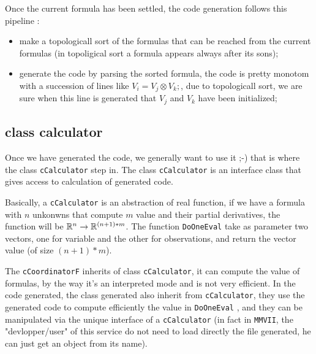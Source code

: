 Once the current formula has been settled, the code generation follows this pipeline :

\begin{itemize}
     \item make a topologicall sort of the formulas that can be reached from the current formulas
         (in topoligical sort a formula appears always after its sons);

     \item generate the code by parsing the sorted formula, the code is pretty monotom with 
           a succession of lines like $V_i = V_j \otimes V_k; $, due to topologicall sort, we are
           sure when this line is generated that $V_j$ and $V_k$ have been initialized;
\end{itemize}



\subsection{class calculator}

Once we have generated the code, we generally want to use it ;-)  that is where 
the class {\tt cCalculator} step in.  The class {\tt cCalculator} is an interface
class that gives access to calculation of generated code.

Basically,  a {\tt cCalculator} is an abstraction of real function,
if we have a formula with $n$ unkonwns that compute $m$ value and their partial derivatives,
the function will be $\mathbb{R}^n \rightarrow \mathbb{R}^{(n+1)*m}$. 
The function {\tt DoOneEval} take as parameter two vectors, one for variable and the other
for observations, and return the vector value (of size $(n+1)*m$).

The {\tt cCoordinatorF} inherits of class {\tt cCalculator}, it can  compute the
value of formulas, by the way it's an interpreted mode and is not very efficient.
In the code generated, the class generated also inherit from {\tt cCalculator},  they
use the generated code to compute efficiently the value in {\tt DoOneEval} ,
and they can be manipulated via the unique interface of a {\tt cCalculator}
(in fact in {\tt MMVII}, the "devlopper/user" of this service do not need to load
directly the file generated, he can just get an object from its name).


